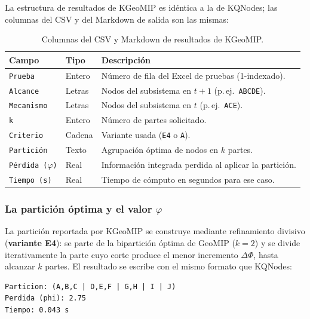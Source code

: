 La estructura de resultados de KGeoMIP es idéntica a la de KQNodes; las columnas del
CSV y del Markdown de salida son las mismas:

\begin{table}[H]
\centering
\begin{tabular}{|l|l|p{7.5cm}|}
\hline
\textbf{Campo} & \textbf{Tipo} & \textbf{Descripción} \\
\hline
\texttt{Prueba}        & Entero & Número de fila del Excel de pruebas (1-indexado). \\
\texttt{Alcance}       & Letras & Nodos del subsistema en $t+1$ (p.\,ej.\ \texttt{ABCDE}). \\
\texttt{Mecanismo}     & Letras & Nodos del subsistema en $t$ (p.\,ej.\ \texttt{ACE}). \\
\texttt{k}             & Entero & Número de partes solicitado. \\
\texttt{Criterio}      & Cadena & Variante usada (\texttt{E4} o \texttt{A}). \\
\texttt{Partición}     & Texto  & Agrupación óptima de nodos en $k$ partes. \\
\texttt{Pérdida ($\varphi$)} & Real & Información integrada perdida al aplicar la partición. \\
\texttt{Tiempo (s)}    & Real   & Tiempo de cómputo en segundos para ese caso. \\
\hline
\end{tabular}
\caption{Columnas del CSV y Markdown de resultados de KGeoMIP.}
\label{tab:campos_solucion_kgeomip}
\end{table}

\subsubsection{La partición óptima y el valor $\varphi$}

La partición reportada por KGeoMIP se construye mediante refinamiento divisivo
(\textbf{variante E4}): se parte de la bipartición óptima de GeoMIP ($k=2$) y se
divide iterativamente la parte cuyo corte produce el menor incremento $\Delta\Phi$,
hasta alcanzar $k$ partes. El resultado se escribe con el mismo formato que KQNodes:

\begin{lstlisting}
Particion: (A,B,C | D,E,F | G,H | I | J)
Perdida (phi): 2.75
Tiempo: 0.043 s
\end{lstlisting}

